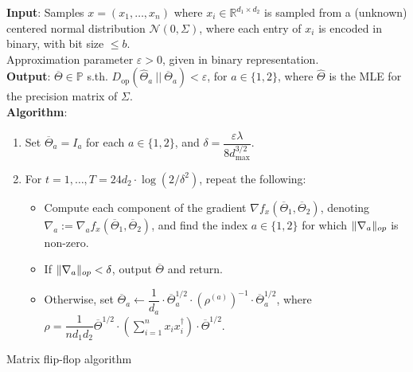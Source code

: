 \documentclass[aos]{imsart}
\theoremstyle{definition}
\numberwithin{equation}{section}
\DeclareMathOperator{\op}{op}
\DeclarePairedDelimiter{\norm}{\lVert}{\rVert}
\newcommand{\R}{{\mathbb{R}}}
\newcommand{\otheta}{\overline{\Theta}}
\newcommand{\htheta}{\widehat{\Theta}}
\newcommand{\eps}{\varepsilon}
\newcommand{\cN}{\mathcal{N}}
\newcommand{\SPD}{\mathbb{P}}
\newcommand{\samp}{x}
\def\dmax{d_{\max}}
\begin{document}
 

\begin{Algorithm}
\textbf{Input}: Samples $\samp = (\samp_1, \ldots, \samp_n)$ where $\samp_i \in \R^{d_1 \times d_2}$ is sampled from a (unknown) centered normal distribution $\cN(0, \Sigma)$, where each entry of $\samp_i$ is encoded in binary, with bit size $\le b$. \\ 
Approximation parameter $\eps > 0$, given in binary representation. \\[.3ex]

\textbf{Output}: $\otheta \in \SPD$ s.th. $D_{\op}(\htheta_a \ || \  \otheta_a) < \eps$, for $a \in \{1,2\}$, where $\htheta$ is the MLE for the precision matrix of $\Sigma$. \\[.3ex]

\textbf{Algorithm}:
\begin{enumerate}
\item\label{it:flip-flop step 1 matrix} Set $\otheta_a = I_a$ for each $a \in \{1,2\}$, and $\delta = \dfrac{\eps \lambda}{8 \dmax^{3/2}}$.

\vspace{5pt}

\item\label{it:flip-flop step 2 matrix} For $t=1,\dots,T = 24 d_2 \cdot \log(2/\delta^2)$, repeat the following:

\vspace{5pt}

\begin{itemize}
\item Compute each component of the gradient $\nabla f_{\samp}(\otheta_1, \otheta_2)$, denoting $\nabla_a := \nabla_a f_{\samp}(\otheta_1, \otheta_2)$, and find the index $a \in \{1,2\}$ for which $\norm{\nabla_a}_{op}$ is non-zero.

\vspace{5pt}

\item
If $\norm{\nabla_a}_{op} < \delta$, output $\otheta$ and return.

\vspace{5pt}

\item Otherwise, set $\otheta_a \leftarrow \dfrac{1}{d_a} \cdot \otheta_a^{1/2} \cdot (\rho^{(a)})^{-1} \cdot \otheta_a^{1/2}$, where $\rho = \dfrac{1}{n d_1 d_2} \otheta^{1/2} \cdot \left( \sum_{i=1}^n x_i x_i^\dagger \right) \cdot \otheta^{1/2}$.
\end{itemize}
\end{enumerate}
\caption{Matrix flip-flop algorithm}\label{alg:flip-flop matrix}
\end{Algorithm}
\end{document}
